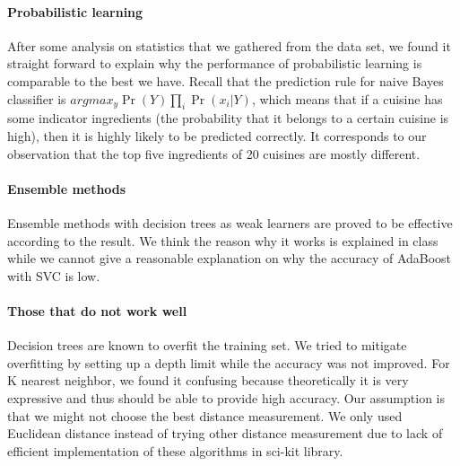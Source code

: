 \paragraph{Probabilistic learning} After some analysis on statistics that we gathered from the data set, we found it straight forward to explain why the performance of probabilistic learning is comparable to the best we have. Recall that the prediction rule for naive Bayes classifier is $argmax_y \Pr(Y)\prod_{i} \Pr(x_i|Y)$, which means that if a cuisine has some indicator ingredients (the probability that it belongs to a certain cuisine is high), then it is highly likely to be predicted correctly. It corresponds to our observation that the top five ingredients of 20 cuisines are mostly different.
 
\paragraph{Ensemble methods} Ensemble methods with decision trees as weak learners are proved to be effective according to the result. We think the reason why it works is explained in class while we cannot give a reasonable explanation on why the accuracy of AdaBoost with SVC is low.

\paragraph{Those that do not work well} Decision trees are known to overfit the training set. We tried to mitigate overfitting by setting up a depth limit while the accuracy was not improved. For K nearest neighbor, we found it confusing because theoretically it is very expressive and thus should be able to provide high accuracy. Our assumption is that we might not choose the best distance measurement. We only used Euclidean distance instead of trying other distance measurement due to lack of efficient implementation of these algorithms in sci-kit library.